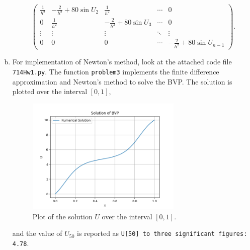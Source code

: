 \documentclass{article}
\begin{document}
\begin{enumerate}[(a)]
\begin{equation*}
\begin{pmatrix}
            \frac{1}{h^2} & -\frac{2}{h^2} + 80 \sin U_2 & \frac{1}{h^2} & \cdots & 0 \\
            0 & \frac{1}{h^2} & -\frac{2}{h^2} + 80 \sin U_3 & \cdots & 0 \\
            \vdots & \vdots & \vdots & \ddots & \vdots \\
            0 & 0 & 0 & \cdots & -\frac{2}{h^2} + 80 \sin U_{n-1}
          \end{pmatrix}.
        \end{equation*}
        \item For implementation of Newton's method, look at the attached code file \texttt{714Hw1.py}. The function \texttt{problem3} implements the finite difference approximation and Newton's method to solve the BVP. The solution is plotted over the interval $[0,1]$,
        \begin{figure}[H]
          \centering
          \includegraphics[width=0.7\textwidth]{Q3b.png}
          \caption{Plot of the solution $U$ over the interval $[0,1]$.}
        \end{figure}
        and the value of $U_{50}$ is reported as \texttt{U[50] to three significant figures: 4.78}.
\end{enumerate}
\end{document}
